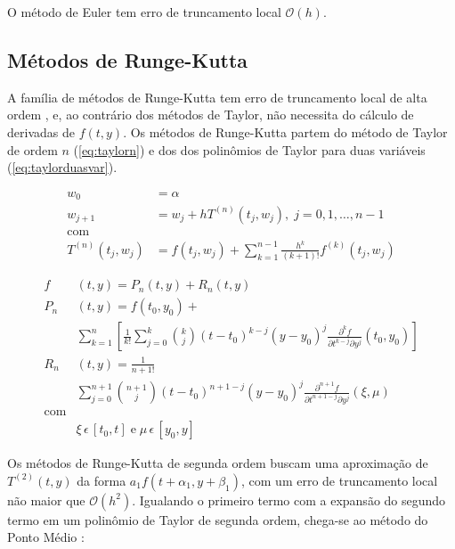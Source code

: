 \documentclass[final,5p]{elsarticle}
\numberwithin{equation}{section}
\begin{document}
        O método de Euler tem erro de truncamento local $\mathcal{O}(h)$.

    \subsection{Métodos de Runge-Kutta}

        A família de métodos de Runge-Kutta tem erro de truncamento local de alta ordem \cite{burden2016analise}, e, ao contrário dos métodos de Taylor, não necessita do cálculo de derivadas de $f(t,y)$. Os métodos de Runge-Kutta partem do método de Taylor de ordem $n$ (\ref{eq:taylorn}) e dos dos polinômios de Taylor para duas variáveis (\ref{eq:taylorduasvar}).

        \begin{subequations} \label{eq:taylorn}
        \begin{align}
            w_0 &= \alpha \nonumber \\
            w_{j+1} &= w_j + h T^{(n)}(t_j,w_j), \; j=0,1,\ldots,n-1 \\
            \text{com}& \nonumber \\
            T^{(n)}(t_j,w_j) &= f(t_j,w_j) + \sum_{k=1}^{n-1}\frac{h^k}{(k+1)!}f^{(k)}(t_j,w_j)
        \end{align}
        \end{subequations}

        \begin{subequations} \label{eq:taylorduasvar}
        \begin{align}
            f&(t,y) = P_n(t,y) + R_n(t,y) \\
            P_n&(t,y) = f(t_0,y_0) + \nonumber \\
            &\sum_{k = 1}^{n} \left[ \frac{1}{k!} \sum_{j = 0}^{k} \binom{k}{j} (t-t_0)^{k-j}(y-y_0)^j\frac{\partial^kf}{\partial t^{k-j} \partial y^j}(t_0,y_0) \right] \\
            R_n&(t,y) = \frac{1}{n+1!} \nonumber \\
            &\sum_{j = 0}^{n+1} \binom{n+1}{j} (t-t_0)^{n+1-j}(y-y_0)^j\frac{\partial^{n+1}f}{\partial t^{n+1-j} \partial y^j}(\xi,\mu) \\
            \text{com}& \nonumber \\
            &\xi \, \epsilon \, [t_0,t] \; \text{e} \; \mu  \, \epsilon \, [y_0,y] \nonumber
        \end{align}
        \end{subequations}

        Os métodos de Runge-Kutta de segunda ordem buscam uma aproximação de $T^{(2)}(t,y)$ da forma $a_1f(t+\alpha_1,y+\beta_1)$, com um erro de truncamento local não maior que $\mathcal{O}(h^2)$. Igualando o primeiro termo com a expansão do segundo termo em um polinômio de Taylor de segunda ordem, chega-se ao método do Ponto Médio \cite{burden2016analise}:
\end{document}

